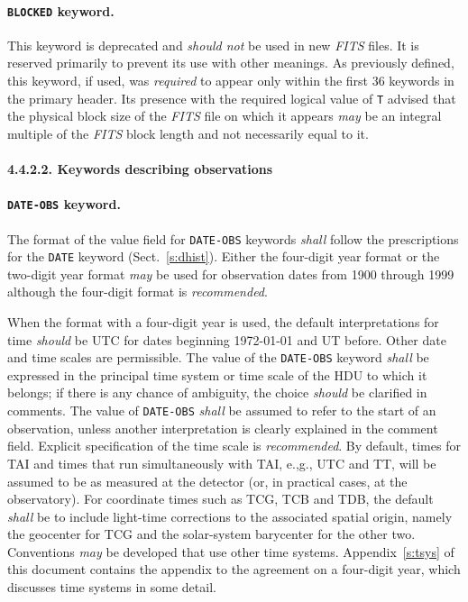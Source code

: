 \documentclass[onecolumn]{aa}
\begin{document}
 \paragraph{{\tt BLOCKED} keyword.}
  This keyword is deprecated and {\em should not} be used in new 
  {\em FITS\/} files.  It is reserved primarily to prevent its use
 with other meanings.
 As previously defined, this keyword, if used, was {\em required} to appear only 
 within the first 36 keywords  in the primary  \label{s:block}
 header.  Its presence with the required logical value of {\tt T} advised that 
 the physical block size of the {\em FITS\/} file on which it
 appears {\em may} be an integral multiple of the {\em FITS\/} block length
 and not necessarily equal to it.
  
     \paragraph{4.4.2.2. Keywords describing observations}
     \label{s:kobs}
 \paragraph{{\tt DATE-OBS} keyword.}
 The format of the value field for {\tt DATE-OBS} keywords 
 {\em shall} follow the prescriptions for the {\tt DATE}
 keyword (Sect.\ \ref{s:dhist}).  Either the four-digit year format or 
 the two-digit year format {\em may} be used for observation dates from 1900
 through 1999 although the four-digit format is {\em recommended}.

 When the format with a four-digit year is used,
 the default interpretations for time {\em should} be 
 UTC for dates beginning 1972-01-01 and UT 
 before.  Other date and time scales are permissible.  The value of 
 the {\tt DATE-OBS} keyword {\em shall} be expressed in the principal time 
 system or time scale of the HDU 
 to which it belongs; if there is any 
 chance of ambiguity, the choice {\em should} be clarified in comments.   
 The value of {\tt DATE-OBS} {\em shall} be
 assumed to refer to the start of an observation, unless another 
 interpretation is clearly explained in the comment field.
 Explicit specification of the time scale is {\em recommended}.  
 By default, times for TAI and times that run simultaneously with TAI, 
 e.,g., UTC and TT,  will be assumed to be as measured at the detector 
 (or, in practical cases, at the observatory).  For coordinate times
 such as TCG, TCB and TDB, the default {\em shall} be
 to include light-time corrections to the associated spatial origin,
 namely the geocenter for TCG and the solar-system barycenter for the
 other two.  Conventions 
 {\em may} be developed that use other time systems. Appendix~\ref{s:tsys}
 of this document contains the appendix to the agreement
 on a four-digit year, which discusses time systems in some detail.  
 
\end{document}
